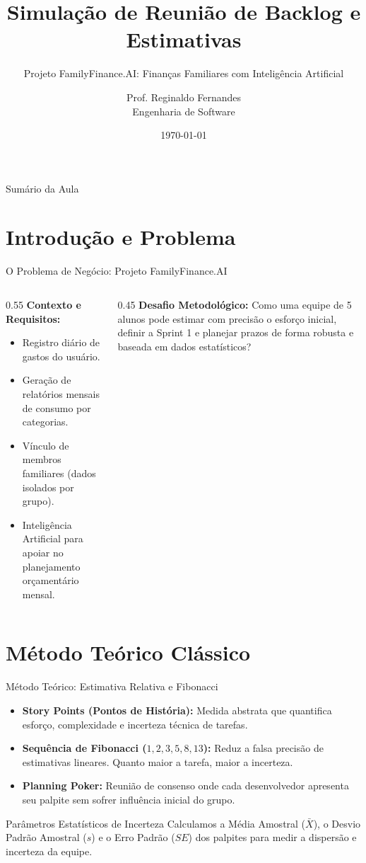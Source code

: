\documentclass[10pt]{beamer}
\title[IFCE Tauá - Planejamento Ágil]{Simulação de Reunião de Backlog e Estimativas}
\subtitle{Projeto FamilyFinance.AI: Finanças Familiares com Inteligência Artificial}
\author[Prof. Reginaldo Fernandes]{Prof. Reginaldo Fernandes\texorpdfstring{\\ \small{Engenharia de Software}}{}}
\institute[IFCE]{Instituto Federal do Ceará -- Campus Tauá}
\date{\today}
\begin{document}
\begin{frame}
    \titlepage
\end{frame}

\begin{frame}{Sumário da Aula}
    \tableofcontents
\end{frame}

\section{Introdução e Problema}
\begin{frame}{O Problema de Negócio: Projeto FamilyFinance.AI}
    \begin{columns}
        \begin{column}{0.55\textwidth}
            \textbf{Contexto e Requisitos:}
            \begin{itemize}
                \item Registro diário de gastos do usuário.
                \item Geração de relatórios mensais de consumo por categorias.
                \item Vínculo de membros familiares (dados isolados por grupo).
                \item Inteligência Artificial para apoiar no planejamento orçamentário mensal.
            \end{itemize}
        \end{column}
        \begin{column}{0.45\textwidth}
            \textbf{Desafio Metodológico:}
            Como uma equipe de 5 alunos pode estimar com precisão o esforço inicial, definir a Sprint 1 e planejar prazos de forma robusta e baseada em dados estatísticos?
        \end{column}
    \end{columns}
\end{frame}

\section{Método Teórico Clássico}
\begin{frame}{Método Teórico: Estimativa Relativa e Fibonacci}
    \begin{itemize}
        \item \textbf{Story Points (Pontos de História):} Medida abstrata que quantifica esforço, complexidade e incerteza técnica de tarefas.
        \item \textbf{Sequência de Fibonacci ($1, 2, 3, 5, 8, 13$):} Reduz a falsa precisão de estimativas lineares. Quanto maior a tarefa, maior a incerteza.
        \item \textbf{Planning Poker:} Reunião de consenso onde cada desenvolvedor apresenta seu palpite sem sofrer influência inicial do grupo.
    \end{itemize}
    \begin{block}{Parâmetros Estatísticos de Incerteza}
        Calculamos a Média Amostral ($\bar{X}$), o Desvio Padrão Amostral ($s$) e o Erro Padrão ($SE$) dos palpites para medir a dispersão e incerteza da equipe.
    \end{block}
\end{frame}
\end{document}
